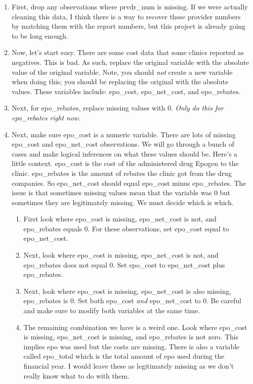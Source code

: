 \documentclass{article}
\begin{document}
	\begin{enumerate}
		\item First, drop any observations where prvdr\_num is missing. If we were actually cleaning this data, I think there is a way to recover these provider numbers by matching them with the report numbers, but this project is already going to be long enough.
		\item Now, let's start easy. There are some cost data that some clinics reported as negatives. This is bad. As such, replace the original variable with the absolute value of the original variable. Note, you should \textit{not} create a new variable when doing this; you should be replacing the original with the absolute values. These variables include: epo\_cost, epo\_net\_cost, and epo\_rebates.
		\item Next, for epo\_rebates, replace missing values with 0. \textit{Only do this for epo\_rebates right now.}
		\item Next, make sure epo\_cost is a numeric variable. There are lots of missing epo\_cost and epo\_net\_cost observations. We will go through a bunch of cases and make logical inferences on what these values should be. Here's a little context. epo\_cost is the cost of the administered drug Epogen to the clinic. epo\_rebates is the amount of rebates the clinic got from the drug companies. So epo\_net\_cost should equal epo\_cost minus epo\_rebates. The issue is that sometimes missing values mean that the variable was 0 but sometimes they are legitimately missing. We must decide which is which.
		\begin{enumerate}
			\item First look where epo\_cost is missing, epo\_net\_cost is not, and epo\_rebates equals 0. For these observations, set epo\_cost equal to epo\_net\_cost.
			\item Next, look where epo\_cost is missing, epo\_net\_cost is not, and epo\_rebates does not equal 0. Set epo\_cost to epo\_net\_cost plus epo\_rebates.
			\item Next, look where epo\_cost is missing, epo\_net\_cost is also missing, epo\_rebates is 0. Set both epo\_cost \textit{and} epo\_net\_cost to 0. Be careful and make sure to modify both variables at the same time. 
			\item The remaining combination we have is a weird one. Look where epo\_cost is missing, epo\_net\_cost is missing, and epo\_rebates is not zero. This implies epo was used but the costs are missing. There is also a variable called epo\_total which is the total amount of epo used during the financial year. I would leave these as legitimately missing as we don't really know what to do with them.

\end{enumerate}
\end{enumerate}
\end{document}
